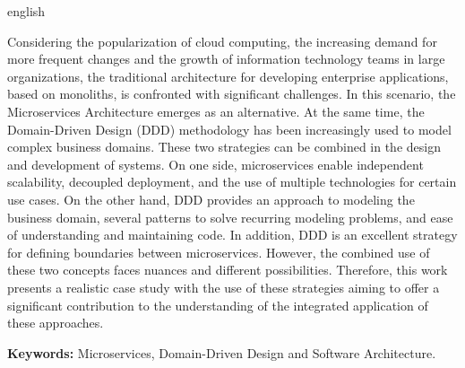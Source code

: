 \begin{resumo}[Abstract]
 \begin{otherlanguage*}{english}


Considering the popularization of cloud computing, the increasing demand for more frequent changes and the growth of information technology teams in large organizations, the traditional architecture for developing enterprise applications, based on monoliths, is confronted with significant challenges. In this scenario, the Microservices Architecture emerges as an alternative. At the same time, the Domain-Driven Design (DDD) methodology has been increasingly used to model complex business domains. These two strategies can be combined in the design and development of systems. On one side, microservices enable independent scalability, decoupled deployment, and the use of multiple technologies for certain use cases. On the other hand, DDD provides an approach to modeling the business domain, several patterns to solve recurring modeling problems, and ease of understanding and maintaining code. In addition, DDD is an excellent strategy for defining boundaries between microservices. However, the combined use of these two concepts faces nuances and different possibilities. Therefore, this work presents a realistic case study with the use of these strategies aiming to offer a significant contribution to the understanding of the integrated application of these approaches.

\textbf{Keywords: } Microservices, Domain-Driven Design and Software Architecture.

\end{otherlanguage*}
\end{resumo}
